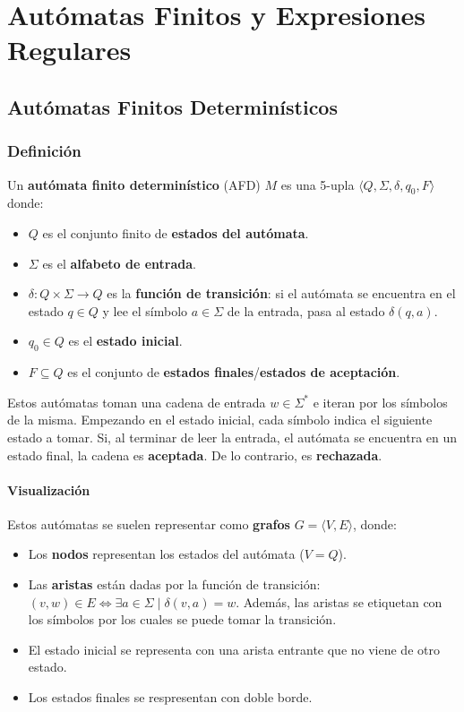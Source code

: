 \chapter{Autómatas Finitos y Expresiones Regulares}

\section{Autómatas Finitos Determinísticos}

\subsection{Definición}

Un \textbf{autómata finito determinístico} (AFD) $M$ es una 5-upla $\langle Q, \Sigma, \delta, q_0, F \rangle$ donde:
\begin{itemize}
    \item $Q$ es el conjunto finito de \textbf{estados del autómata}.
    \item $\Sigma$ es el \textbf{alfabeto de entrada}.
    \item $\delta: Q \times \Sigma \to Q$ es la \textbf{función de transición}: si el autómata se encuentra en el estado $q \in Q$ y lee el símbolo $a \in \Sigma$ de la entrada, pasa al estado $\delta(q, a)$.
    \item $q_0 \in Q$ es el \textbf{estado inicial}.
    \item $F \subseteq Q$ es el conjunto de \textbf{estados finales}/\textbf{estados de aceptación}.
\end{itemize}


Estos autómatas toman una cadena de entrada $w \in \Sigma^*$ e iteran por los símbolos de la misma. Empezando en el estado inicial, cada símbolo indica el siguiente estado a tomar. Si, al terminar de leer la entrada, el autómata se encuentra en un estado final, la cadena es \textbf{aceptada}. De lo contrario, es \textbf{rechazada}.

\subsubsection{Visualización}

Estos autómatas se suelen representar como \textbf{grafos} $G = \langle V, E \rangle$, donde:
\begin{itemize}
    \item Los \textbf{nodos} representan los estados del autómata ($V = Q$).
    \item Las \textbf{aristas} están dadas por la función de transición: $(v, w) \in E \iff \exists a \in \Sigma \mid \delta(v, a) = w$. Además, las aristas se etiquetan con los símbolos por los cuales se puede tomar la transición.
    \item El estado inicial se representa con una arista entrante que no viene de otro estado.
    \item Los estados finales se respresentan con doble borde.
\end{itemize}

